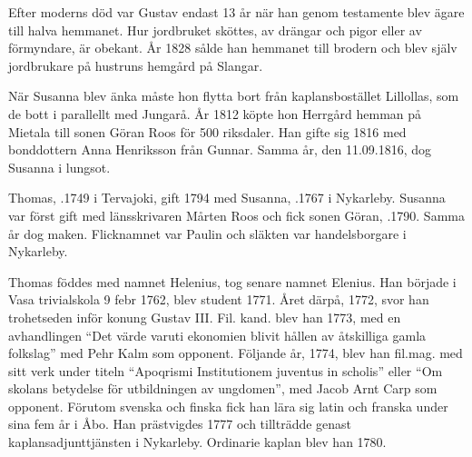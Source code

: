 Efter moderns död var Gustav endast 13 år när han genom testamente blev ägare till halva hemmanet. Hur jordbruket sköttes, av drängar och pigor eller av förmyndare, är obekant. År 1828 sålde han hemmanet till brodern och blev själv jordbrukare på hustruns hemgård på Slangar.


När Susanna blev änka måste hon flytta bort från kaplansbostället Lillollas, som de bott i parallellt med Jungarå. År 1812 köpte hon Herrgård hemman på Mietala till sonen Göran Roos för 500 riksdaler. Han gifte sig 1816 med bonddottern Anna Henriksson från Gunnar. Samma år, den 11.09.1816, dog Susanna i lungsot.


Thomas, .1749 i Tervajoki, gift 1794 med Susanna, .1767 i Nykarleby. Susanna var först gift med länsskrivaren Mårten Roos och fick sonen Göran, .1790. Samma år dog maken. Flicknamnet var Paulin och släkten var handelsborgare i 	Nykarleby.
\begin{jhchildren}
  \item {}
  \item {}
  \item {}
  \item {}
  \item {}
  \item {}
  \item {}
  \item {}
\end{jhchildren}
Thomas föddes med namnet Helenius, tog senare namnet Elenius. Han började i Vasa trivialskola 9 febr 1762, blev student 1771. Året därpå, 1772, svor han trohetseden inför konung Gustav III. Fil. kand. blev han 1773, med en avhandlingen ``Det värde varuti ekonomien blivit hållen av åtskilliga gamla folkslag'' med Pehr Kalm som opponent. Följande år, 1774, blev han fil.mag. med sitt verk under titeln ``Apoqrismi Institutionem juventus in scholis'' eller ``Om skolans betydelse för utbildningen av ungdomen'', med Jacob Arnt Carp som opponent. Förutom svenska och finska fick han lära sig latin och franska under sina fem år i Åbo. Han prästvigdes 1777 och tillträdde genast kaplansadjunttjänsten i Nykarleby. Ordinarie kaplan blev han 1780.

